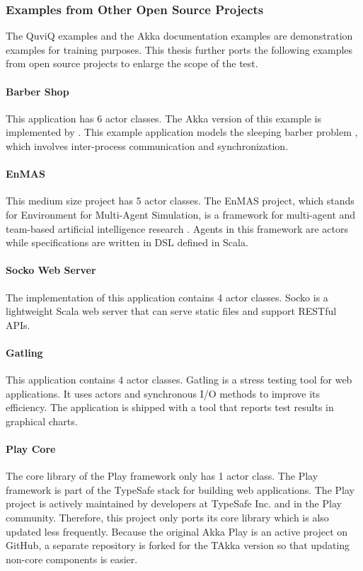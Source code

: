 \subsubsection{Examples from Other Open Source Projects}

The QuviQ examples and the Akka documentation examples are demonstration 
examples for training purposes.  This thesis further ports the following 
examples from open source projects to enlarge the scope of the test.

\paragraph{Barber Shop}  This application has 6 actor classes.  The Akka 
version of this example is implemented by \citet{BarberShop}.  This example
application models the sleeping barber problem \citep{wiki:barber}, which 
involves inter-process communication and synchronization.

\paragraph{EnMAS} This medium size project has 5 actor classes.  The EnMAS 
project, which stands for Environment for Multi-Agent Simulation, is a framework 
for multi-agent and team-based artificial intelligence research \citep{EnMAS}.  
Agents in this framework are actors while specifications are written in DSL 
defined in Scala.


\paragraph{Socko Web Server} The implementation of this application contains 
4 actor classes.  Socko \citep{SOCKO} is a lightweight Scala web server that 
can serve static files and support RESTful APIs.  

\paragraph{Gatling}  This application contains 4 actor classes.  Gatling  
\citep{Gatling} is a stress testing tool for web applications.  It uses actors 
and synchronous I/O methods to improve its efficiency.  The application is 
shipped with a tool that reports test results in graphical charts.

\paragraph{Play Core} The core library of the Play framework only has 1 actor 
class.  The Play framework \citep{play_doc} is part of the TypeSafe stack for 
building web applications.  The Play project is actively maintained by 
developers at TypeSafe Inc. and in the Play community.  Therefore, this project 
only ports its core library which is also updated less frequently.
Because the original Akka Play is an active project on GitHub, a separate repository is 
forked for the TAkka version \citep{takka_play} so that updating non-core components is easier.





